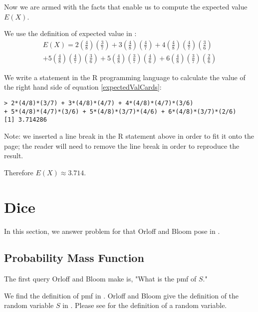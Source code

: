 \documentclass[a4paper,11pt]{article}
\begin{document}
Now we are armed with the facts that enable us to compute the expected
value $E\left( X \right)$.

We use the definition of expected value in \cite{reading4b}:
\begin{equation}\label{expectedValCards}
\begin{split}
  E\left( X \right) = 
    2\left(\frac{4}{8} \right) \left( \frac{3}{7} \right)
  + 3 \left( \frac{4}{8} \right) \left( \frac{4}{7} \right)
  + 4 \left( \frac{4}{8} \right) \left( \frac{4}{7} \right) 
    \left( \frac{3}{6} \right) \\
  + 5 \left( \frac{4}{8} \right) \left( \frac{4}{7} \right)
    \left( \frac{3}{6} \right)
  + 5 \left( \frac{4}{8} \right) \left( \frac{3}{7} \right)
    \left( \frac{4}{6} \right)
  + 6 \left( \frac{4}{8} \right) \left( \frac{3}{7} \right)
    \left( \frac{2}{6} \right)
\end{split}
\end{equation}

We write a statement in the R programming language to calculate 
the value of the right hand side of equation \ref{expectedValCards}:

\begin{lstlisting}
> 2*(4/8)*(3/7) + 3*(4/8)*(4/7) + 4*(4/8)*(4/7)*(3/6) 
+ 5*(4/8)*(4/7)*(3/6) + 5*(4/8)*(3/7)*(4/6) + 6*(4/8)*(3/7)*(2/6)
[1] 3.714286
\end{lstlisting}

Note: we inserted a line break in the R statement above in order to
fit it onto the page; the reader will need to remove the line break
in order to reproduce the result.

Therefore $E \left( X \right) \approx 3.714$.

\section{Dice}
In this section, we answer problem for that Orloff and Bloom pose in
\cite{probSet2}.

\subsection{Probability Mass Function}

The first query Orloff and Bloom make is, "What is the pmf of $S$."

We find the definition of pmf in \cite{reading4b}.  Orloff and Bloom
give the definition of the random variable $S$ in \cite{probSet2}.
Please see \cite{reading4} for the definition of a random variable.
\end{document}
